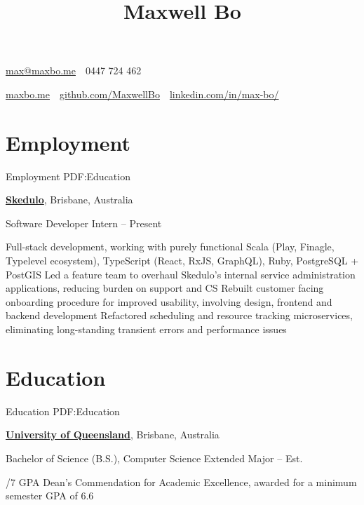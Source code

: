 \documentclass[a4paper,10pt,oneside]{article}
\begin{document}

\title{Maxwell Bo}

\begin{subtitle}
\par \href{mailto:max@maxbo.me}{max@maxbo.me} \,\BulletSymbol\, 0447 724 462

\par \href{http://maxbo.me/}{maxbo.me} 
\,\BulletSymbol\, 
\href{https://github.com/MaxwellBo}{github.com/MaxwellBo}
\,\BulletSymbol\, 
\href{https://www.linkedin.com/in/max-bo/}{linkedin.com/in/max-bo/}

\end{subtitle}

\begin{body}


\section
{Employment}
{Employment}
{PDF:Education}

\href{https://skedulo.com/}{\textbf{Skedulo}}, Brisbane, Australia
\par Software Developer Intern\hfill {} -- Present 
\begin{detail}
	\BulletItem Full-stack development, working with purely functional Scala (Play, Finagle, Typelevel ecosystem),\newline
	TypeScript (React, RxJS, GraphQL), Ruby, PostgreSQL + PostGIS
	\BulletItem Led a feature team to overhaul Skedulo's internal service administration applications, reducing burden on support and CS
	\BulletItem Rebuilt customer facing onboarding procedure for improved usability, involving design, frontend and backend development
	\BulletItem Refactored scheduling and resource tracking microservices, eliminating long-standing transient errors and performance issues
\end{detail}


\section
{Education}
{Education}
{PDF:Education}

\href{https://www.uq.edu.au/}{\textbf{University of Queensland}}, Brisbane, Australia
\par Bachelor of Science (B.S.), Computer Science Extended Major\hfill {} -- Est. 
\begin{detail}
/7 GPA
\BulletItem Dean's Commendation for Academic Excellence, awarded for a minimum semester GPA of 6.6 \hfill {}
\end{detail}


\end{body}
\end{document}
